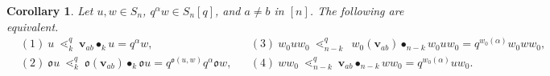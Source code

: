\documentclass[12pt,oneside,reqno]{amsart}
\newtheorem{corollary}[theorem]{Corollary}
\theoremstyle{definition}
\numberwithin{equation}{section}
\newcommand{\qv}{{\mathbf v}}
\DeclareMathOperator{\kactionop}{{\scriptstyle \bullet}}
\newcommand{\kaction}[1][k]{\kactionop_{#1}}
\newcommand{\ncycle}{\mathfrak o}
\begin{document}
\begin{corollary}\label{C:symmetries-q-ops}
  Let $u,w\in S_n$,  $q^\alpha w\in S_n[q]$, and $a\neq b$ in $[n]$.
  The following are equivalent.
  \begin{align*}
    & (1)\ u\ \lessdot_k^q\ \qv_{ab}\kaction u = q^\alpha w,
    & &(3)\ w_0uw_0\ \lessdot_{n-k}^q\ \ w_0(\qv_{ab})\kactionop_{n-k} w_0uw_0 =  q^{w_0(\alpha)} w_0 w w_0,\\
    & (2)\ \ncycle u\ \lessdot_k^q\ \ncycle(\qv_{ab})\kaction \ncycle u = q^{\ncycle(u,w)} q^\alpha \ncycle w,
    & &(4)\ w w_0\ \lessdot_{n-k}^q\ \qv_{ab}\kactionop_{n-k} ww_0 = q^{w_0(\alpha)} u w_0.
 \end{align*}
\end{corollary}
\end{document}

